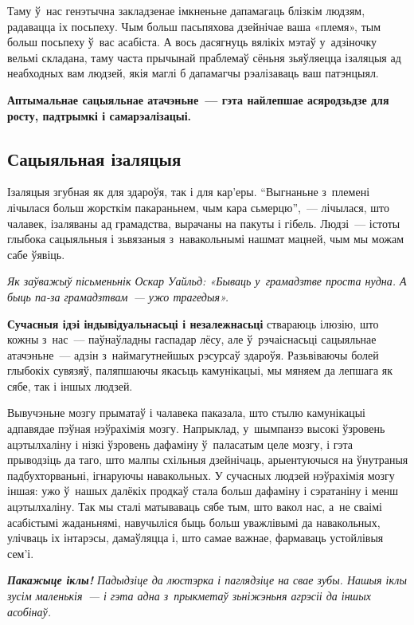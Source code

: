 Таму ў~нас генэтычна закладзенае імкненьне дапамагаць блізкім людзям, радавацца іх посьпеху. Чым больш пасьпяхова дзейнічае ваша «племя», тым больш посьпеху ў~вас асабіста. А вось дасягнуць вялікіх мэтаў у~адзіночку вельмі складана, таму часта прычынай праблемаў сёньня зьяўляецца ізаляцыя ад неабходных вам людзей, якія маглі б дапамагчы рэалізаваць ваш патэнцыял. 

\textbf{Аптымальнае сацыяльнае атачэньне~--- гэта найлепшае асяродзьдзе для росту, падтрымкі і самарэалізацыі.}

\subsection*{Сацыяльная ізаляцыя}

Ізаляцыя згубная як для здароўя, так і для кар'еры. ``Выгнаньне з~племені лічылася больш жорсткім пакараньнем, чым кара сьмерцю'',~--- лічылася, што чалавек, ізаляваны ад грамадства, вырачаны на пакуты і гібель. Людзі~--- істоты глыбока сацыяльныя і зьвязаныя з~навакольнымі нашмат мацней, чым мы можам сабе ўявіць.

\emph{Як заўважыў пісьменьнік Оскар Уайльд: «Бываць у~грамадзтве проста нудна. А быць па-за грамадзтвам~--- ужо трагедыя».}

\textbf{Сучасныя ідэі індывідуальнасьці і незалежнасьці} ствараюць ілюзію, што кожны з~нас~--- паўнаўладны гаспадар лёсу, але ў~рэчаіснасьці сацыяльнае атачэньне~--- адзін з~наймагутнейшых рэсурсаў здароўя. Разьвіваючы болей глыбокіх сувязяў, паляпшаючы якасьць камунікацыі, мы мяняем да лепшага як сябе, так і іншых людзей.

Вывучэньне мозгу прыматаў і чалавека паказала, што стылю камунікацыі адпавядае пэўная нэўрахімія мозгу. Напрыклад, у~шымпанзэ высокі ўзровень ацэтылхаліну і нізкі ўзровень дафаміну ў~паласатым целе мозгу, і гэта прыводзіць да таго, што малпы схільныя дзейнічаць, арыентуючыся на ўнутраныя падбухторваньні, ігнаруючы навакольных. У сучасных людзей нэўрахімія мозгу іншая: ужо ў~нашых далёкіх продкаў стала больш дафаміну і сэратаніну і менш ацэтылхаліну. Так мы сталі матываваць сябе тым, што вакол нас, а~не сваімі асабістымі жаданьнямі, навучыліся быць больш уважлівымі да навакольных, улічваць іх інтарэсы, дамаўляцца і, што самае важнае, фармаваць устойлівыя сем'і.

\emph{\textbf{Пакажыце іклы!} Падыдзіце да люстэрка і паглядзіце на свае зубы. Нашыя іклы зусім маленькія~--- і гэта адна з~прыкметаў зьніжэньня агрэсіі да іншых асобінаў.}

